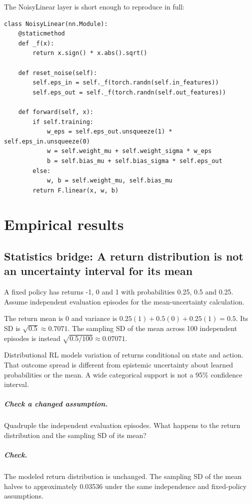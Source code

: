 \documentclass[11pt,oneside]{scrbook}
\begin{document}
The NoisyLinear layer is short enough to reproduce in full:

\begin{verbatim}
class NoisyLinear(nn.Module):
    @staticmethod
    def _f(x):
        return x.sign() * x.abs().sqrt()

    def reset_noise(self):
        self.eps_in = self._f(torch.randn(self.in_features))
        self.eps_out = self._f(torch.randn(self.out_features))

    def forward(self, x):
        if self.training:
            w_eps = self.eps_out.unsqueeze(1) * self.eps_in.unsqueeze(0)
            w = self.weight_mu + self.weight_sigma * w_eps
            b = self.bias_mu + self.bias_sigma * self.eps_out
        else:
            w, b = self.weight_mu, self.bias_mu
        return F.linear(x, w, b)
\end{verbatim}

\chapter{Empirical results}

\section{Statistics bridge: A return distribution is not an uncertainty interval for its mean}
\begin{example}
A fixed policy has returns -1, 0 and 1 with probabilities 0.25, 0.5 and 0.25. Assume independent evaluation episodes for the mean-uncertainty calculation.

The return mean is 0 and variance is $0.25(1)+0.5(0)+0.25(1)=0.5$. Its SD is $\sqrt{0.5}\approx0.7071$. The sampling SD of the mean across 100 independent episodes is instead $\sqrt{0.5/100}\approx0.07071$.
\end{example}
Distributional RL models variation of returns conditional on state and action. That outcome spread is different from epistemic uncertainty about learned probabilities or the mean. A wide categorical support is not a 95\% confidence interval.

\paragraph{Check a changed assumption.} Quadruple the independent evaluation episodes. What happens to the return distribution and the sampling SD of its mean?
\paragraph{Check.} The modeled return distribution is unchanged. The sampling SD of the mean halves to approximately 0.03536 under the same independence and fixed-policy assumptions.
\end{document}

